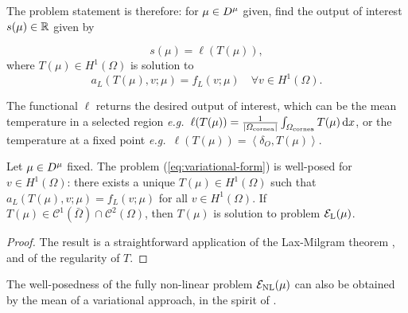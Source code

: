 The problem statement is therefore: for $\mu\in D^{\mu}$ given, find the output of interest $s(\mu)\in\mathbb{R}$ given by

\begin{equation}
    s(\mu) = \ell(T(\mu)),
\end{equation}
where $T(\mu)\in H^1(\Omega)$ is solution to
\begin{equation}
    \label{eq:variational-formulation}
    a_L(T(\mu), v; \mu) = f_L(v; \mu)\quad \forall v\in H^1(\Omega).
\end{equation}

The functional $\ell$ returns the desired output of interest, which can be the mean temperature in a selected region
\emph{e.g.\ }$\ell(T(\mu)) = \frac1{|\Omega_\text{cornea}|}\int_{\Omega_\text{cornea}}T(\mu)\,\mathrm{d} x$,
or the temperature at a fixed point \emph{e.g.\ }$\ell(T(\mu)) = \left<\delta_O, T(\mu)\right>$.




\begin{thm}
    Let $\mu\in D^{\mu}$ fixed.
    The problem (\ref{eq:variational-form}) is well-posed for $v\in H^1(\Omega)$:
    there exists a unique $T(\mu)\in H^1(\Omega)$ such that $a_L(T(\mu), v; \mu) = f_L(v; \mu)$ for all $v\in H^1(\Omega)$.
    If $T(\mu)\in \mathcal{C}^1(\bar{\Omega})\cap \mathcal{C}^2(\Omega)$, then $T(\mu)$ is solution to problem $\mathcal{E}_\text{L}(\mu)$.
\end{thm}

\begin{proof}
    The result is a straightforward application of the Lax-Milgram theorem \cite{Ern2021-mi}, and of the regularity of $T$.
\end{proof}


\begin{rem}
    The well-posedness of the fully non-linear problem $\mathcal{E}_\text{NL}(\mu)$ can also be obtained by the mean of a variational approach, in the spirit of \cite{Milka1993}.
\end{rem}

